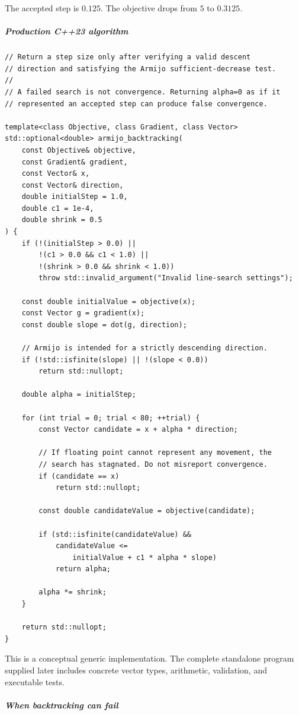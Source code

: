 The accepted step is \(0.125\). The objective drops from \(5\) to \(0.3125\).

\subparagraph{Production C++23 algorithm}\label{production-c23-algorithm}

\begin{verbatim}
// Return a step size only after verifying a valid descent
// direction and satisfying the Armijo sufficient-decrease test.
//
// A failed search is not convergence. Returning alpha=0 as if it
// represented an accepted step can produce false convergence.

template<class Objective, class Gradient, class Vector>
std::optional<double> armijo_backtracking(
    const Objective& objective,
    const Gradient& gradient,
    const Vector& x,
    const Vector& direction,
    double initialStep = 1.0,
    double c1 = 1e-4,
    double shrink = 0.5
) {
    if (!(initialStep > 0.0) ||
        !(c1 > 0.0 && c1 < 1.0) ||
        !(shrink > 0.0 && shrink < 1.0))
        throw std::invalid_argument("Invalid line-search settings");

    const double initialValue = objective(x);
    const Vector g = gradient(x);
    const double slope = dot(g, direction);

    // Armijo is intended for a strictly descending direction.
    if (!std::isfinite(slope) || !(slope < 0.0))
        return std::nullopt;

    double alpha = initialStep;

    for (int trial = 0; trial < 80; ++trial) {
        const Vector candidate = x + alpha * direction;

        // If floating point cannot represent any movement, the
        // search has stagnated. Do not misreport convergence.
        if (candidate == x)
            return std::nullopt;

        const double candidateValue = objective(candidate);

        if (std::isfinite(candidateValue) &&
            candidateValue <=
                initialValue + c1 * alpha * slope)
            return alpha;

        alpha *= shrink;
    }

    return std::nullopt;
}
\end{verbatim}

This is a conceptual generic implementation. The complete standalone program supplied later includes concrete vector types, arithmetic, validation, and executable tests.

\subparagraph{When backtracking can fail}\label{when-backtracking-can-fail}

